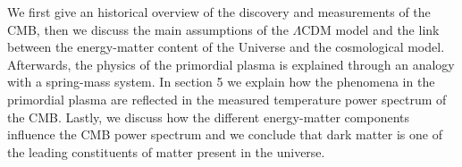 \documentclass{article}
\begin{document}
We first give an historical overview of the discovery and measurements of the CMB, then we discuss the main assumptions of the $\Lambda$CDM model and the link between the energy-matter content of the Universe and the cosmological model. 
Afterwards, the physics of the primordial plasma is explained through an analogy with a spring-mass system.
In section 5 we explain how the phenomena in the primordial plasma are reflected in the measured temperature power spectrum of the CMB.
Lastly, we discuss how the different energy-matter components influence the CMB power spectrum and we conclude that dark matter is one of the leading constituents of matter present in the universe.


\pagebreak
\end{document}
